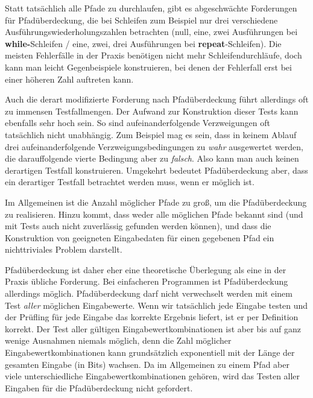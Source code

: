 Statt tatsächlich alle Pfade zu durchlaufen, gibt es abgeschwächte Forderungen für Pfad\-über\-deckung, die bei Schleifen zum Beispiel nur drei verschiedene Ausführungswiederholungszahlen betrachten (null, eine, zwei Ausführungen bei \textbf{while-}Schleifen / eine, zwei, drei Ausführungen bei \textbf{repeat}-Schleifen). Die meisten Fehlerfälle in der Praxis benötigen nicht mehr Schleifendurchläufe, doch kann man leicht Gegenbeispiele konstruieren, bei denen der Fehlerfall erst bei einer höheren Zahl auftreten kann.

Auch die derart modifizierte Forderung nach Pfadüberdeckung führt allerdings oft zu immensen Testfallmengen. Der Aufwand zur Konstruktion dieser Tests kann ebenfalls sehr hoch sein. So sind aufeinanderfolgende Verzweigungen oft tatsächlich nicht unabhängig. Zum Beispiel mag es sein, dass in keinem Ablauf drei aufeinanderfolgende Verzweigungsbedingungen zu \emph{wahr} ausgewertet werden, die darauffolgende vierte Bedingung aber zu \emph{falsch}. Also kann man auch keinen derartigen Testfall konstruieren. Umgekehrt bedeutet Pfadüberdeckung aber, dass ein derartiger Testfall betrachtet werden muss, wenn er möglich ist.

Im Allgemeinen ist die Anzahl möglicher Pfade zu groß, um die Pfadüberdeckung zu realisieren. Hinzu kommt, dass weder alle möglichen Pfade bekannt sind (und mit Tests auch nicht zuverlässig gefunden werden können), und dass die Konstruktion von geeigneten Eingabedaten für einen gegebenen Pfad ein nichttriviales Problem darstellt.

Pfadüberdeckung ist daher eher eine theoretische Überlegung als eine in der Praxis übliche Forderung. Bei einfacheren Programmen ist Pfadüberdeckung allerdings möglich. Pfadüberdeckung darf nicht verwechselt werden mit einem Test \textit{aller} möglichen Eingabewerte. Wenn wir tatsächlich jede Eingabe testen und der Prüfling für jede Eingabe das korrekte Ergebnis liefert, ist er per Definition korrekt. Der Test aller gültigen Eingabewertkombinationen ist aber bis auf ganz wenige Ausnahmen niemals möglich, denn die Zahl möglicher Eingabewertkombinationen kann grundsätzlich exponentiell mit der Länge der gesamten Eingabe (in Bits) wachsen. Da im Allgemeinen zu einem Pfad aber viele unterschiedliche Eingabewertkombinationen gehören, wird das Testen aller Eingaben für die Pfadüberdeckung nicht gefordert. 